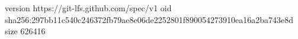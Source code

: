 version https://git-lfs.github.com/spec/v1
oid sha256:297bb11c540c246372fb79ae8e06de2252801f890054273910ea16a2ba743e8d
size 626416
